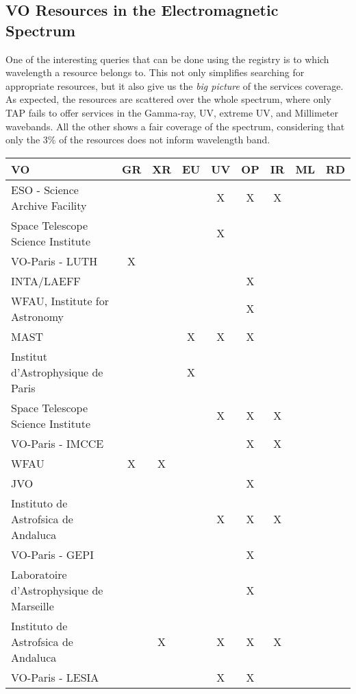 \subsection{VO Resources in the Electromagnetic Spectrum}

One of the interesting queries that can be done using the registry is
to which wavelength a resource belongs to. This not only simplifies
searching for appropriate resources, but it also give us the 
\emph{big picture} of the services coverage. As expected, 
the resources are scattered over the whole spectrum, where
only TAP fails to offer services in the Gamma-ray, UV, extreme UV, and Millimeter
wavebands. All the other shows a fair coverage of the spectrum, considering
that only the 3\% of the resources does not inform wavelength band. 


\begin{table}
\begin{center}
\begin{tabular}{|l|c|c|c|c|c|c|c|c|}
\hline
\textbf{VO} & GR & XR & EU & UV & OP & IR & ML & RD \\
\hline
\hline
  ESO - Science Archive Facility  & & & & X & X & X & & \\
\hline
  Space Telescope Science Institute & & & & X & & & & \\
\hline
  VO-Paris - LUTH & X & & & & & & & \\
\hline
  INTA/LAEFF & & & & & X & & & \\
\hline
  WFAU, Institute for Astronomy & & & & & X & & & \\
\hline
  MAST & & & X & X & X & & & \\
\hline
  Institut d'Astrophysique de Paris & & & X & & & & & \\
\hline
  Space Telescope Science Institute & & & & X & X & X & & \\
\hline
  VO-Paris - IMCCE & & & & & X & X & & \\
\hline
  WFAU & X & X & & & & & & \\
\hline
  JVO & & & & & X & & & \\
\hline
  Instituto de Astrofsica de Andaluca & & & & X & X & X & & \\
\hline
  VO-Paris - GEPI  & & & & & X & & & \\
\hline
  Laboratoire d'Astrophysique de Marseille & & & & & X & & & \\
\hline
  Instituto de Astrofsica de Andaluca & & X & & X & X & X & & \\
\hline
  VO-Paris - LESIA & & & & X & X & & & \\

\end{tabular}
\end{center}
\end{table}
